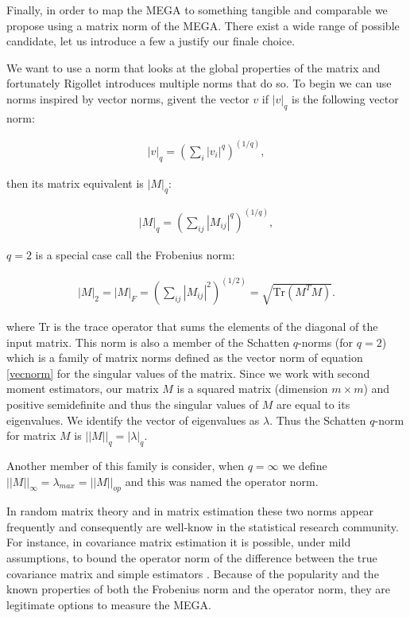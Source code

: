 \documentclass{article}
\begin{document}
{Finally, in order to map the MEGA to something tangible and comparable we propose using a matrix norm of the MEGA. There exist a wide range of possible candidate, let us introduce a few a justify our finale choice. 

\bigskip

We want to use a norm that looks at the global properties of the matrix and fortunately Rigollet \cite{rigollet15} introduces multiple norms that do so. To begin we can use norms inspired by vector norms, givent the vector $v$ if $|v|_q$ is the following vector norm:

\begin{align}
|v|_q = (\sum_i |v_i|^q)^{(1/q)},
\label{vecnorm}
\end{align}

then its matrix equivalent is $|M|_q$:

\begin{align}
|M|_q = (\sum_{ij} |M_{ij}|^q)^{(1/q)},
\label{matnorm}
\end{align}

$q=2$ is a special case call the Frobenius norm:

\begin{align}
|M|_2 = |M|_F = (\sum_{ij} |M_{ij}|^2)^{(1/2)} = \sqrt{\text{Tr}(M^TM)}.
\label{Frobe}
\end{align}

where Tr is the trace operator that sums the elements of the diagonal of the input matrix. This norm is also a member of the Schatten $q$-norms (for $q=2$) which is a family of matrix norms defined as the vector norm of equation \ref{vecnorm} for the singular values of the matrix. Since we work with second moment estimators, our matrix $M$ is a squared matrix (dimension $m \times m$) and positive semidefinite and thus the singular values of $M$ are equal to its eigenvalues.  We identify the vector of eigenvalues as $\lambda$. Thus the  Schatten $q$-norm for matrix $M$ is $||M||_q=|\lambda|_q$. 

\bigskip

Another member of this family is consider, when $q=\infty$ we define $||M||_\infty = \lambda_{max} = ||M||_{op}$ and this was named the operator norm.

\bigskip

In random matrix theory and in matrix estimation these two norms appear frequently and consequently are well-know in the statistical research community. For instance, in covariance matrix estimation it is possible, under mild assumptions, to bound the operator norm of the difference between the true covariance matrix and simple estimators \cite{rigollet15}. Because of the popularity and the known properties of both the Frobenius norm and the operator norm, they are legitimate options to measure the MEGA. 

}
\end{document}
